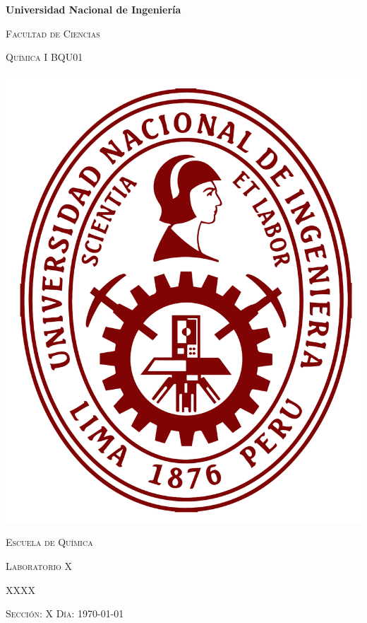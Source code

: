 \documentclass[../main]{subfiles}
\begin{document}
\begin{titlepage}
  \vspace*{\fill}
  \centering
  {\bfseries\LARGE Universidad Nacional de Ingeniería \par}
  \vspace{12pt}
  {\scshape\large Facultad de Ciencias \par}
  \vspace{0.5cm}
  {\scshape\huge Química I BQU01 \par}
  \vspace{0.5cm}
  \includegraphics[height=0.3\textheight]{resources/uni_logo.png}\par
  \vspace{0.5cm}  
  {\scshape\large Escuela de Química \par}
  \vspace{1cm}
  {\scshape\huge Laboratorio X}\par
  \vspace{0.5cm}
  {\scshape\large XXXX \par}
  {\scshape\normalsize Sección: X \hspace{12pt} Día: \today \par}

\end{titlepage}
\end{document}

